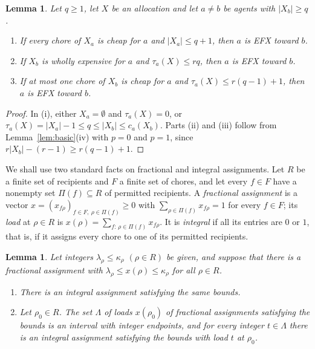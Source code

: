 \documentclass{amsart}
\numberwithin{equation}{section}
\newtheorem{lemma}[theorem]{Lemma}
\theoremstyle{definition}
\theoremstyle{remark}
\begin{document}
\begin{lemma}\label{lem:bounds}
Let $q\ge 1$, let $X$ be an allocation and let $a\ne b$ be agents with $|X_b|\ge q$.
\begin{enumerate}[label=\textup{(\roman*)}]
\item If every chore of $X_a$ is cheap for $a$ and $|X_a|\le q+1$, then $a$ is EFX toward $b$.
\item If $X_b$ is wholly expensive for $a$ and $\tau_a(X)\le rq$, then $a$ is EFX toward $b$.
\item If at most one chore of $X_b$ is cheap for $a$ and $\tau_a(X)\le r(q-1)+1$, then $a$ is EFX toward $b$.
\end{enumerate}
\end{lemma}

\begin{proof}
In (i), either $X_a=\emptyset$ and $\tau_a(X)=0$, or $\tau_a(X)=|X_a|-1\le q\le|X_b|\le c_a(X_b)$. Parts (ii) and (iii) follow from Lemma~\ref{lem:basic}(iv) with $p=0$ and $p=1$, since $r|X_b|-(r-1)\ge r(q-1)+1$.
\end{proof}

We shall use two standard facts on fractional and integral assignments. Let $R$ be a finite set of recipients and $F$ a finite set of chores, and let every $f\in F$ have a nonempty set $\Pi(f)\subseteq R$ of permitted recipients. A \emph{fractional assignment} is a vector $x=(x_{f\rho})_{f\in F,\ \rho\in\Pi(f)}\ge 0$ with $\sum_{\rho\in\Pi(f)}x_{f\rho}=1$ for every $f\in F$; its \emph{load} at $\rho\in R$ is $x(\rho)=\sum_{f:\,\rho\in\Pi(f)}x_{f\rho}$. It is \emph{integral} if all its entries are $0$ or $1$, that is, if it assigns every chore to one of its permitted recipients.

\begin{lemma}\label{lem:integral}
Let integers $\lambda_\rho\le\kappa_\rho$ $(\rho\in R)$ be given, and suppose that there is a fractional assignment with $\lambda_\rho\le x(\rho)\le\kappa_\rho$ for all $\rho\in R$.
\begin{enumerate}[label=\textup{(\alph*)}]
\item There is an integral assignment satisfying the same bounds.
\item Let $\rho_0\in R$. The set $\Lambda$ of loads $x(\rho_0)$ of fractional assignments satisfying the bounds is an interval with integer endpoints, and for every integer $t\in\Lambda$ there is an integral assignment satisfying the bounds with load $t$ at $\rho_0$.
\end{enumerate}
\end{lemma}
\end{document}
